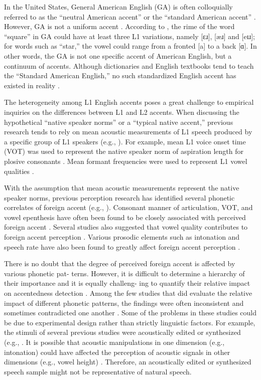 In the United States, General American English (GA) is often colloquially referred to as the “neutral American accent” or  the “standard American accent” \citep{Lippi-Green_2012, Wells_1982}. However, GA is not a uniform accent \citep{Wells_1982}. According to \citet{Wells_1982}, the rime of the word “square” in GA could have at least three L1 variations, namely [ɛɹ], [æɹ] and [eɪɹ]; for words such as “star,” the vowel could range from a fronted [a] to a back [ɑ]. In other words, the GA is not one specific accent of American English, but a continuum of accents. Although dictionaries and English textbooks tend to teach the “Standard American English,” no such standardized English accent has existed in reality \citep{Lippi-Green_2012}. 

The heterogeneity among L1 English accents poses a great challenge to empirical inquiries on the differences between L1 and L2 accents. When discussing the hypothetical “native speaker norms” or a “typical native accent,” previous research tends to rely on mean acoustic measurements of L1 speech produced by a specific group of L1 speakers (e.g., \citealp{Chan_2016, McCullough_2013}). For example, mean L1 voice onset time (VOT) was used to represent the native speaker norm of aspiration length for plosive consonants \citep{Riney_1999}. Mean formant frequencies were used to represent L1 vowel qualities \citep{Chan_2016}. 

With the assumption that mean acoustic measurements represent the native speaker norms, previous perception research has identified several phonetic correlates of foreign accent (e.g., \citealp{Chan_2016,Riney_1999, Solon_2015}). Consonant manner of articulation, VOT, and vowel epenthesis have often been found to be closely associated with perceived foreign accent \citep{Chan_2016, Magen_1998, Munro_1998, Riney_1998, Solon_2015}. Several studies also suggested that vowel quality contributes to foreign accent perception \citep{Braun_2011, Major_1986,Park_2013}. Various prosodic elements such as intonation and speech rate have also been found to greatly affect foreign accent perception \citep{Hahn_2004, Kang_2010, Munro_2001, Zielinski_2008}.

There is no doubt that the degree of perceived foreign accent is affected by various phonetic pat- terns. However, it is difficult to determine a hierarchy of their importance and it is equally challeng- ing to quantify their relative impact on accentedness detection \citep{Munro_1995, Rognoni_2014}. Among the few studies that did evaluate the relative impact of different phonetic patterns, the findings were often inconsistent and sometimes contradicted one another \citep{Magen_1998, van_den_Doel_2006}. Some of the problems in these studies could be due to experimental design rather than strictly linguistic factors. For example, the stimuli of several previous studies were acoustically edited or synthesized (e.g., \citealp{Chan_2016, Jilka_2000, Magen_1998}. It is possible that acoustic manipulations in one dimension (e.g., intonation) could have affected the perception of acoustic signals in other dimensions (e.g., vowel height) \citep{Whalen_1995}. Therefore, an acoustically edited or synthesized speech sample might not be representative of natural speech. 

